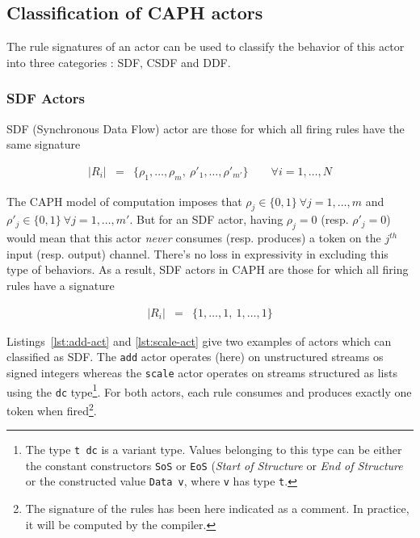 \subsection{Classification of CAPH actors}
\label{sec:class-caph-actors}

The rule signatures of an actor can be used to classify the behavior of this actor into three
categories : SDF, CSDF and DDF.

\subsubsection{SDF Actors}
\label{sec:sdf-actors}

SDF (Synchronous Data Flow) actor are those for which all firing rules have the same signature

\begin{eqnarray*}
|R_i| & = & \{ \rho_1, \ldots, \rho_m,\ \rho'_1, \ldots, \rho'_{m'} \}   \qquad \forall i=1,\ldots,N
\end{eqnarray*}

The CAPH model of computation imposes that $\rho_j \in \{0,1\}\ \forall j=1,\ldots,m$ and $\rho'_j
\in \{0,1\}\ \forall j=1,\ldots,m'$. But for an SDF actor, having $\rho_j = 0$ (resp. $\rho'_j=0$)
would mean that this actor \emph{never} consumes (resp. produces) a token on the $j^{th}$ input
(resp. output) channel. There's no loss in expressivity in excluding this type of behaviors. As a
result, SDF actors in CAPH are those for which all firing rules have a signature

\begin{eqnarray*}
  |R_i| & = & \{1, \ldots, 1,\ 1, \ldots, 1\}
\end{eqnarray*}

\medskip Listings~\ref{lst:add-act} and \ref{lst:scale-act} give two examples of actors which can
classified as SDF. The \verb|add| actor operates (here) on unstructured streams os signed integers
whereas the \verb|scale| actor operates on streams structured as lists using the \verb|dc|
type\footnote{The type \texttt{t dc} is a variant type. Values belonging to this type can be either
  the constant constructors \texttt{SoS} or \texttt{EoS} (\emph{Start of Structure} or \emph{End of
    Structure} or the constructed value
  \texttt{Data v}, where \texttt{v} has type \texttt{t}.}. For both
actors, each rule consumes and produces exactly one token when fired\footnote{The signature of the
  rules has been here indicated as a comment. In practice, it will be computed by the compiler.}. 

